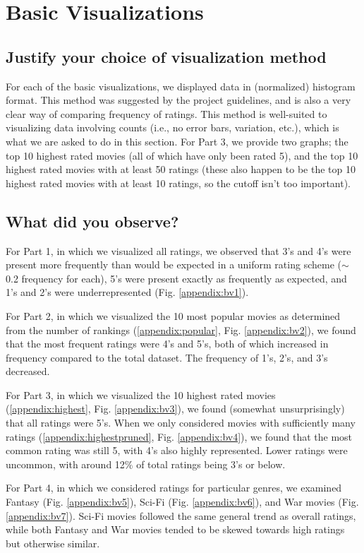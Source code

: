 \section{Basic Visualizations}
\medskip
\subsection*{Justify your choice of visualization method}
For each of the basic visualizations, we displayed data in (normalized) histogram format. This method was suggested by the project guidelines, and is also a very clear way of comparing frequency of ratings. This method is well-suited to visualizing data involving counts (i.e., no error bars, variation, etc.), which is what we are asked to do in this section. For Part 3, we provide two graphs; the top 10 highest rated movies (all of which have only been rated 5), and the top 10 highest rated movies with at least 50 ratings (these also happen to be the top 10 highest rated movies with at least 10 ratings, so the cutoff isn't too important).
\smallskip
\subsection*{What did you observe?}
For Part 1, in which we visualized all ratings, we observed that 3's and 4's were present more frequently than would be expected in a uniform rating scheme ($\sim$ 0.2 frequency for each), 5's were present exactly as frequently as expected, and 1's and 2's were underrepresented (Fig. \ref{appendix:bv1}).

For Part 2, in which we visualized the 10 most popular movies as determined from the number of rankings (\ref{appendix:popular}, Fig. \ref{appendix:bv2}), we found that the most frequent ratings were 4's and 5's, both of which increased in frequency compared to the total dataset. The frequency of 1's, 2's, and 3's decreased.

For Part 3, in which we visualized the 10 highest rated movies (\ref{appendix:highest}, Fig. \ref{appendix:bv3}), we found (somewhat unsurprisingly) that all ratings were 5's. When we only considered movies with sufficiently many ratings (\ref{appendix:highestpruned}, Fig. \ref{appendix:bv4}), we found that the most common rating was still 5, with 4's also highly represented. Lower ratings were uncommon, with around 12$\%$ of total ratings being 3's or below.

For Part 4, in which we considered ratings for particular genres, we examined Fantasy (Fig. \ref{appendix:bv5}), Sci-Fi (Fig. \ref{appendix:bv6}), and War movies (Fig. \ref{appendix:bv7}). Sci-Fi movies followed the same general trend as overall ratings, while both Fantasy and War movies tended to be skewed towards high ratings but otherwise similar.
\smallskip
